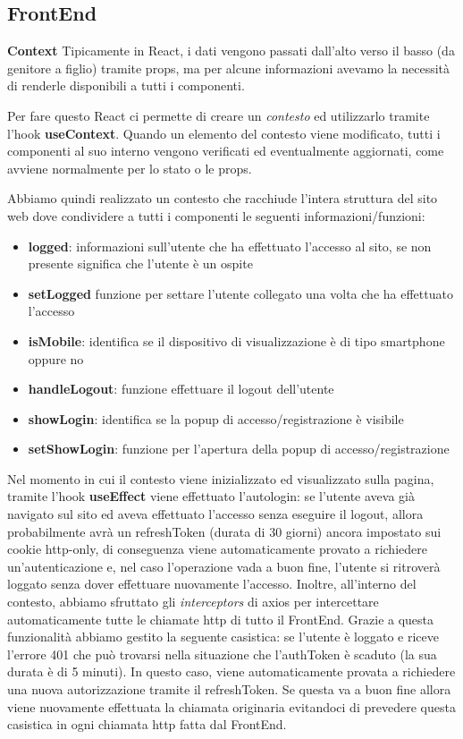 \clearpage

\subsection{FrontEnd}

\bigbreak
\noindent
\textbf{Context}
\bigbreak
\noindent
Tipicamente in React, i dati vengono passati dall'alto verso il basso (da genitore a figlio) tramite props, 
ma per alcune informazioni avevamo la necessità di renderle disponibili a tutti i componenti.

Per fare questo React ci permette di creare un \textit{contesto} ed utilizzarlo tramite l'hook \textbf{useContext}.
Quando un elemento del contesto viene modificato, tutti i componenti al suo interno vengono verificati ed eventualmente aggiornati, 
come avviene normalmente per lo stato o le props.

Abbiamo quindi realizzato un contesto che racchiude l'intera struttura del sito web dove condividere a tutti i componenti le seguenti informazioni/funzioni:
\begin{itemize}
	\item \textbf{logged}: informazioni sull'utente che ha effettuato l'accesso al sito, se non presente significa che l'utente è un ospite
	\item \textbf{setLogged} funzione per settare l'utente collegato una volta che ha effettuato l'accesso
	\item \textbf{isMobile}: identifica se il dispositivo di visualizzazione è di tipo smartphone oppure no
	\item \textbf{handleLogout}: funzione effettuare il logout dell'utente
	\item \textbf{showLogin}: identifica se la popup di accesso/registrazione è visibile
	\item \textbf{setShowLogin}: funzione per l'apertura della popup di accesso/registrazione
\end{itemize}

Nel momento in cui il contesto viene inizializzato ed visualizzato sulla pagina, 
tramite l'hook \textbf{useEffect} viene effettuato l'autologin: 
se l'utente aveva già navigato sul sito ed aveva effettuato l'accesso senza eseguire il logout,
allora probabilmente avrà un refreshToken (durata di 30 giorni) ancora impostato sui cookie http-only,
di conseguenza viene automaticamente provato a richiedere un'autenticazione e,
nel caso l'operazione vada a buon fine, 
l'utente si ritroverà loggato senza dover effettuare nuovamente l'accesso.
\bigbreak
Inoltre, all'interno del contesto, abbiamo sfruttato gli \textit{interceptors} di axios per intercettare automaticamente tutte le chiamate http di tutto il FrontEnd.
Grazie a questa funzionalità abbiamo gestito la seguente casistica: 
se l'utente è loggato e riceve l'errore 401 che può trovarsi nella situazione che l'authToken è scaduto (la sua durata è di 5 minuti).
In questo caso, viene automaticamente provata a richiedere una nuova autorizzazione tramite il refreshToken.
Se questa va a buon fine allora viene nuovamente effettuata la chiamata originaria evitandoci di prevedere questa casistica in ogni chiamata http fatta dal FrontEnd.

